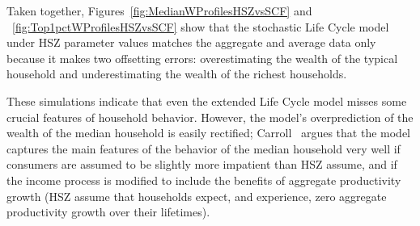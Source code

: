 \documentclass[titlepage,12pt]{article}
\begin{document}
\hypertarget{Top1pctWProfilesHSZvsSCF}{}

Taken together, Figures~\ref{fig:MedianWProfilesHSZvsSCF} and 
~\ref{fig:Top1pctWProfilesHSZvsSCF} show that the stochastic Life 
Cycle model under HSZ parameter values matches the aggregate and 
average data only because it makes two offsetting errors: 
overestimating the wealth of the typical household and underestimating 
the wealth of the richest households.

These simulations indicate that even the extended Life Cycle model 
misses some crucial features of household behavior.  However, the 
model's overprediction of the wealth of the median household is easily 
rectified; Carroll~\citeyear{carroll:brookings,carrollBSLCPIH} argues 
that the model captures the main features of the behavior of the 
median household very well if consumers are assumed to be slightly more 
impatient than HSZ assume, and if the income process is modified to 
include the benefits of aggregate productivity growth (HSZ assume that 
households expect, and experience, zero aggregate productivity growth 
over their lifetimes).  
\end{document}
